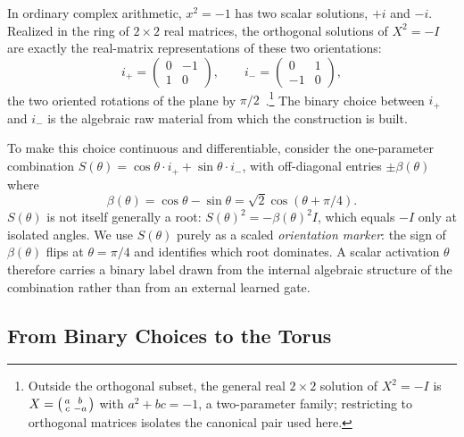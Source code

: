 \documentclass{article}
\begin{document}
In ordinary complex arithmetic, $x^2 = -1$ has two scalar solutions, $+i$ and $-i$. Realized in the ring of $2 \times 2$ real matrices, the orthogonal solutions of $X^2 = -I$ are exactly the real-matrix representations of these two orientations:
\[
i_+ = \begin{pmatrix} 0 & -1 \\ 1 & 0 \end{pmatrix}, \qquad i_- = \begin{pmatrix} 0 & 1 \\ -1 & 0 \end{pmatrix},
\]
the two oriented rotations of the plane by $\pi/2$~\cite{patel2025quantuminspired}.\footnote{Outside the orthogonal subset, the general real $2\times 2$ solution of $X^2=-I$ is $X = \begin{psmallmatrix} a & b \\ c & -a \end{psmallmatrix}$ with $a^2 + bc = -1$, a two-parameter family; restricting to orthogonal matrices isolates the canonical pair used here.} The binary choice between $i_+$ and $i_-$ is the algebraic raw material from which the construction is built.

To make this choice continuous and differentiable, consider the one-parameter combination $S(\theta) = \cos\theta \cdot i_+ + \sin\theta \cdot i_-$, with off-diagonal entries $\pm \beta(\theta)$ where
\[
\beta(\theta) = \cos\theta - \sin\theta = \sqrt{2}\cos(\theta + \pi/4).
\]
$S(\theta)$ is not itself generally a root: $S(\theta)^2 = -\beta(\theta)^2 I$, which equals $-I$ only at isolated angles. We use $S(\theta)$ purely as a scaled \emph{orientation marker}: the sign of $\beta(\theta)$ flips at $\theta = \pi/4$ and identifies which root dominates. A scalar activation $\theta$ therefore carries a binary label drawn from the internal algebraic structure of the combination rather than from an external learned gate.

\subsection{From Binary Choices to the Torus}
\end{document}
